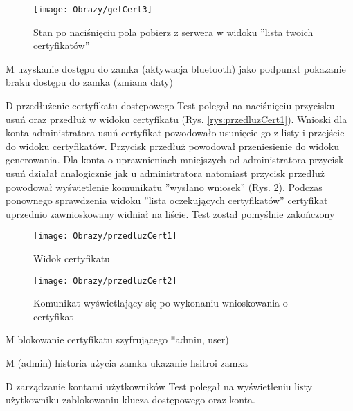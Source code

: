 \begin{enumerate*}
\begin{figure}[ht!]
		
		\begin{minipage}{0.2\textwidth}
			\texttt{[image: Obrazy/getCert3]}
			\caption{Stan po naciśnięciu pola pobierz z serwera w widoku ''lista twoich certyfikatów''}
			\label{rys:getCert3}
		\end{minipage}
		
	
	\end{figure}
	
	
	\item M uzyskanie dostępu do zamka (aktywacja bluetooth)
		 jako podpunkt pokazanie braku dostępu do zamka (zmiana daty)
	\item D przedłużenie certyfikatu dostępowego
	Test polegał na naciśnięciu przycisku usuń oraz przedłuż w widoku certyfikatu (Rys. \ref{rys:przedluzCert1}).
	Wnioski dla konta administratora usuń certyfikat powodowało usunięcie go z listy i przejście do widoku certyfikatów. Przycisk przedłuż powodował przeniesienie do widoku generowania. Dla konta o uprawnieniach  mniejszych od administratora przycisk usuń działał analogicznie jak u administratora natomiast przycisk przedłuż powodował wyświetlenie komunikatu ''wysłano wniosek'' (Rys. \ref{rys:przedluzCert2}).
	Podczas ponownego sprawdzenia  widoku ''lista oczekujących certyfikatów'' certyfikat uprzednio zawnioskowany  widniał  na liście. Test został pomyślnie zakończony
	
	
		\begin{figure}[ht!]
		
		\begin{minipage}{0.2\textwidth}
			\texttt{[image: Obrazy/przedluzCert1]}
			\caption{Widok certyfikatu }
			\label{rys:przedluzCert1}
		\end{minipage}
		
		\begin{minipage}{0.2\textwidth}
			\texttt{[image: Obrazy/przedluzCert2]}
			\caption{Komunikat wyświetlający się po wykonaniu wnioskowania o certyfikat }
			\label{rys:przedluzCert2}
		\end{minipage}
		
		
	
		
	\end{figure}
	
	
	\item M blokowanie certyfikatu szyfrującego *admin, user)
	\item M (admin) historia użycia zamka
	ukazanie hsitroi zamka
	\item D zarządzanie kontami użytkowników
		Test polegał na wyświetleniu listy użytkowniku zablokowaniu klucza dostępowego oraz konta.
		

\end{enumerate*}
